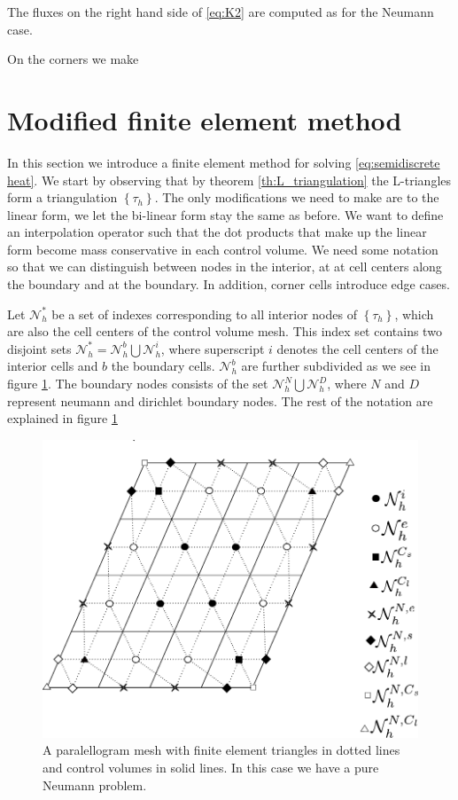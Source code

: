 \documentclass[../Main/main.tex]{subfiles}
\begin{document}
	The fluxes on the right hand side of \eqref{eq:K2} are computed as for the Neumann case.
	\par On the corners we make 
	\section*{Modified finite element method}
	
	In this section we introduce a finite element method for solving \eqref{eq:semidiscrete heat}. We start by observing that by theorem \ref{th:L_triangulation} the L-triangles form a triangulation $\left \{ \tau_h \right \}$. The only modifications we need to make are to the linear form, we let the bi-linear form stay the same as before. We want to define an interpolation operator such that the dot products that make up the linear form become mass conservative in each control volume. We need some notation so that we can distinguish between nodes in the interior, at at cell centers along the boundary and at the boundary. In addition, corner cells introduce edge cases. 
	\par 
	Let $\mathcal{N}_h^*$ be a set of indexes corresponding to all interior nodes of $\left \{ \tau_h \right \}$, which are also the cell centers of the control volume mesh. This index set contains two disjoint sets $\mathcal{N}_h^* = \mathcal{N}_h^b \bigcup \mathcal{N}_h^i$, where superscript $i$ denotes the cell centers of the interior cells and $b$ the boundary cells. $\mathcal{N}^b_h$ are further subdivided as we see in figure \ref{fig:mesWithNodes}. The boundary nodes consists of the set $\mathcal{N}_h^N \bigcup \mathcal{N}_h^D$, where $N$ and $D$ represent neumann and dirichlet boundary nodes. The rest of the notation are explained in figure \ref{fig:mesWithNodes}
	\begin{figure}[H]
		\centering
		\includegraphics{meshWithNodes.pdf}

		\caption{A paralellogram mesh with finite element triangles in dotted lines and control volumes in solid lines. In this case we have a pure Neumann problem.}
		\label{fig:mesWithNodes}
	\end{figure}
\end{document}

